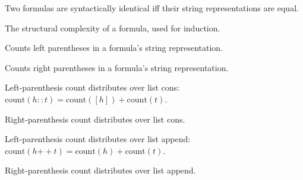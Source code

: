 \begin{definition}\label{def:formula_syntactic_identity}
  \leanok
  Two formulas are syntactically identical iff their string representations are equal.
\end{definition}

\begin{definition}\label{def:formula_complexity}
  \leanok
  The structural complexity of a formula, used for induction.
\end{definition}

\begin{definition}\label{def:formula_lp}
  \leanok
  Counts left parentheses in a formula's string representation.
\end{definition}

\begin{definition}\label{def:formula_rp}
  \leanok
  Counts right parentheses in a formula's string representation.
\end{definition}

\begin{theorem}\label{thm:formula_lp_count_monotonicity}
  \leanok
  Left-parenthesis count distributes over list cons:
  $\mathrm{count}(h::t) = \mathrm{count}([h]) + \mathrm{count}(t)$.
\end{theorem}

\begin{theorem}\label{thm:formula_rp_count_monotonicity}
  \leanok
  Right-parenthesis count distributes over list cons.
\end{theorem}

\begin{theorem}\label{thm:formula_lp_count_append_monotonicity}
  \leanok
  Left-parenthesis count distributes over list append:
  $\mathrm{count}(h \mathbin{+\!\!+} t) = \mathrm{count}(h) + \mathrm{count}(t)$.
\end{theorem}

\begin{theorem}\label{thm:formula_rp_count_append_monotonicity}
  \leanok
  Right-parenthesis count distributes over list append.
\end{theorem}

